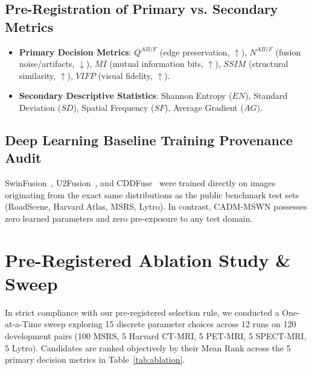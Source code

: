 \documentclass[conference]{IEEEtran}
\begin{document}
\subsection{Pre-Registration of Primary vs. Secondary Metrics}
\begin{itemize}
    \item \textbf{Primary Decision Metrics}: $Q^{AB/F}$ (edge preservation, $\uparrow$), $N^{AB/F}$ (fusion noise/artifacts, $\downarrow$), $MI$ (mutual information bits, $\uparrow$), $SSIM$ (structural similarity, $\uparrow$), $VIFP$ (visual fidelity, $\uparrow$).
    \item \textbf{Secondary Descriptive Statistics}: Shannon Entropy ($EN$), Standard Deviation ($SD$), Spatial Frequency ($SF$), Average Gradient ($AG$).
\end{itemize}

\subsection{Deep Learning Baseline Training Provenance Audit}
SwinFusion~\cite{tang2022image}, U2Fusion~\cite{xu2022u2fusion}, and CDDFuse~\cite{zhao2023cddfuse} were trained directly on images originating from the exact same distributions as the public benchmark test sets (RoadScene, Harvard Atlas, MSRS, Lytro). In contrast, CADM-MSWN possesses zero learned parameters and zero pre-exposure to any test domain.

\section{Pre-Registered Ablation Study \& Sweep}
In strict compliance with our pre-registered selection rule, we conducted a One-at-a-Time sweep exploring 15 discrete parameter choices across 12 runs on 120 development pairs (100 MSRS, 5 Harvard CT-MRI, 5 PET-MRI, 5 SPECT-MRI, 5 Lytro). Candidates are ranked objectively by their Mean Rank across the 5 primary decision metrics in Table~\ref{tab:ablation}.
\end{document}
